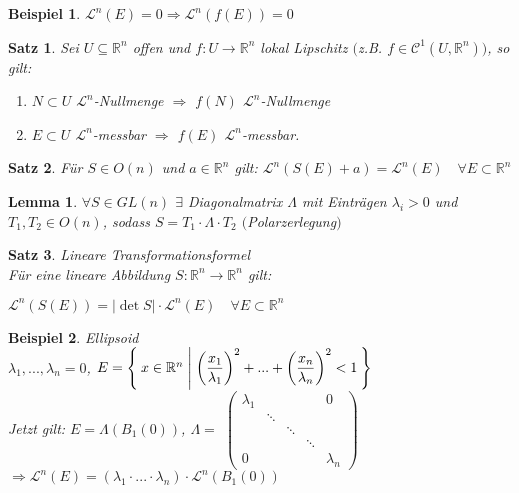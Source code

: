 \documentclass[11pt]{memoir}
\theoremstyle{changebreak}
\newtheorem{Beispiel}{Beispiel}[chapter]
\newtheorem{Lemma}{Lemma}[chapter]
\newtheorem{Satz}{Satz}[chapter]
\begin{document}
\begin{Beispiel}
$\mathscr L^n(E) = 0 \Rightarrow \mathscr L^n(f(E)) = 0$
\end{Beispiel}



\begin{Satz}
Sei $U \subseteq \mathbb R^n$ offen und $f: U \rightarrow \mathbb R^n$ lokal Lipschitz $($z.B. $f \in \mathscr C^1(U, \mathbb R^n))$, so gilt:
\begin{enumerate}
	\item $N \subset U$ $\mathscr L^n$-Nullmenge $\Rightarrow$ $f(N)$ $\mathscr L^n$-Nullmenge
	\item $E \subset U$ $\mathscr L^n$-messbar $\Rightarrow$ $f(E)$ $\mathscr L^n$-messbar.
\end{enumerate}
\end{Satz}


\begin{Satz}
Für $S \in O(n)$ und $a \in \mathbb R^n$ gilt:
$\mathscr L^n (S(E) +a) = \mathscr L^n(E)\quad \forall E \subset \mathbb R^n$
\end{Satz}


\begin{Lemma}
$\forall S \in GL(n)$ $\exists$ Diagonalmatrix $\Lambda$ mit Einträgen $\lambda_i > 0$ und $T_1, T_2 \in O(n)$, sodass $S = T_1\cdotp\Lambda\cdotp T_2$ $($Polarzerlegung$)$
\end{Lemma}


\begin{Satz}
\emph{Lineare Transformationsformel} \\
Für eine lineare Abbildung $S: \mathbb R^n \rightarrow \mathbb R^n$ gilt: 
\begin{center}
	$\mathscr L^n(S(E)) = \vert\det S \vert \cdotp \mathscr L^n(E) \quad \forall E \subset \mathbb R^n$
\end{center}
\end{Satz}


\begin{Beispiel}
\emph{Ellipsoid} \\
$\lambda_1, ..., \lambda_n = 0$, $E = \Set{ x \in \mathbb R^n | \left( \dfrac{x_1}{\lambda_1} \right)^2 + ... + \left (\dfrac{x_n}{\lambda_n}\right)^2 < 1 }$ \\
Jetzt gilt: $E = \Lambda(B_1(0))$,\; $\Lambda =$
$\begin{pmatrix}
      \lambda_1 & 	 &	&	& 0 \\
      		 &  	\ddots \\
		 &	& \ddots \\
		 &	&	& \ddots \\
		 0 &	&	&	&	\lambda_n
\end{pmatrix}$ \\
$\Rightarrow \mathscr L^n(E) = (\lambda_1 \cdotp ... \cdotp \lambda_n) \cdotp \mathscr L^n(B_1(0))$
\end{Beispiel}
\end{document}
